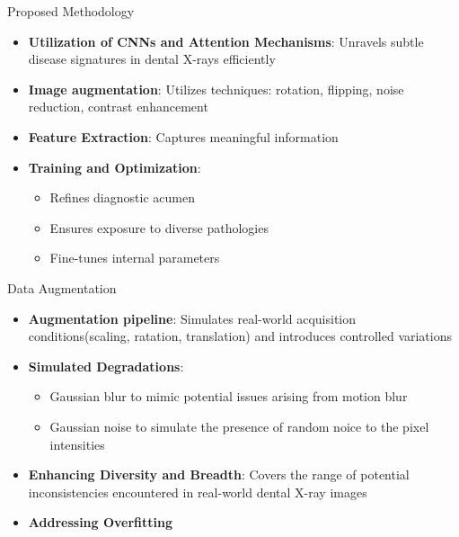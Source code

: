 \documentclass{beamer}
\begin{document}
\begin{frame}{Proposed Methodology}
	\begin{itemize}
		\vfill
		\item \textbf{Utilization of CNNs and Attention Mechanisms}: Unravels subtle disease signatures in dental X-rays efficiently	
		\vfill 
		\item \textbf{Image augmentation}: Utilizes techniques: rotation, flipping, noise reduction, contrast enhancement
		\vfill 
		\item \textbf{Feature Extraction}: Captures meaningful information
		\vfill
		\item \textbf{Training and Optimization}:
		\begin{itemize}
			\item Refines diagnostic acumen
			\item Ensures exposure to diverse pathologies
			\item Fine-tunes internal parameters
		\end{itemize}
	\end{itemize}
\end{frame}

\begin{frame}{Data Augmentation}
  	\begin{itemize}
		\vfill
		\item \textbf{Augmentation pipeline}: Simulates real-world acquisition conditions(scaling, ratation, translation) and introduces controlled variations
		\vfill
		\item \textbf{Simulated Degradations}:
		\begin{itemize}
			\item Gaussian blur to mimic potential issues arising from motion blur
			\item Gaussian noise to simulate the presence of random noice to the pixel intensities
		\end{itemize}
		\vfill
		\item \textbf{Enhancing Diversity and Breadth}: Covers the range of potential inconsistencies encountered in real-world dental X-ray images
		\vfill
		\item \textbf{Addressing Overfitting}
	\end{itemize}
\end{frame}
\end{document}
